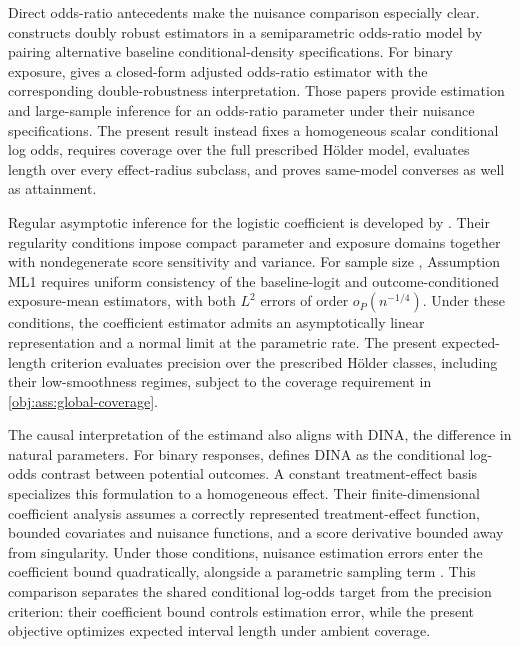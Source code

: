 \documentclass[11pt]{article}
\begin{document}
Direct odds-ratio antecedents make the nuisance comparison especially clear. \citet{TchetgenTchetgen2010} constructs doubly robust estimators in a semiparametric odds-ratio model by pairing alternative baseline conditional-density specifications. For binary exposure, \citet{TchetgenTchetgen2013} gives a closed-form adjusted odds-ratio estimator with the corresponding double-robustness interpretation. Those papers provide estimation and large-sample inference for an odds-ratio parameter under their nuisance specifications. The present result instead fixes a homogeneous scalar conditional log odds, requires coverage over the full prescribed Hölder model, evaluates length over every effect-radius subclass, and proves same-model converses as well as attainment.

Regular asymptotic inference for the logistic coefficient is developed by \citet[arXiv version 1, Assumptions REG and ML1, Theorem 2]{LiuZhangZhou2020LogisticDML}. Their regularity conditions impose compact parameter and exposure domains together with nondegenerate score sensitivity and variance. For sample size , Assumption ML1 requires uniform consistency of the baseline-logit and outcome-conditioned exposure-mean estimators, with both \(L^2\) errors of order \(o_P(n^{-1/4})\). Under these conditions, the coefficient estimator admits an asymptotically linear representation and a normal limit at the parametric rate. The present expected-length criterion evaluates precision over the prescribed Hölder classes, including their low-smoothness regimes, subject to the coverage requirement in \cref{obj:ass:global-coverage}.

The causal interpretation of the estimand also aligns with DINA, the difference in natural parameters. For binary responses, \citet[Section 2.1.1, equation (5)]{GaoHastie2025DINA} defines DINA as the conditional log-odds contrast between potential outcomes. A constant treatment-effect basis specializes this formulation to a homogeneous effect. Their finite-dimensional coefficient analysis assumes a correctly represented treatment-effect function, bounded covariates and nuisance functions, and a score derivative bounded away from singularity. Under those conditions, nuisance estimation errors enter the coefficient bound quadratically, alongside a parametric sampling term \citep[Section 3.3, Proposition 1]{GaoHastie2025DINA}. This comparison separates the shared conditional log-odds target from the precision criterion: their coefficient bound controls estimation error, while the present objective optimizes expected interval length under ambient coverage.
\end{document}
